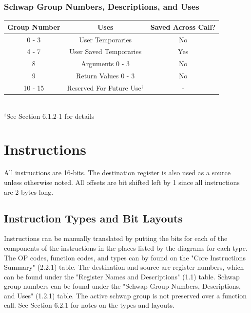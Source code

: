 \documentclass{article}
\begin{document}
		\subsubsection{Schwap Group Numbers, Descriptions, and Uses}
			\begin{center}
				\begin{tabular}{| c | c | c |}
					\hline
				    	Group Number & Uses                      & Saved Across Call? \\ \hline
					    0 - 3        & User Temporaries          & No \\ \hline
					    4 - 7        & User Saved Temporaries    & Yes\\ \hline
					    8            & Arguments 0 - 3           & No \\ \hline
					    9            & Return Values 0 - 3       & No \\ \hline
					    10 - 15      & Reserved For Future Use$^\dagger$ & -  \\ \hline
				\end{tabular} \\
				$^\dagger$See Section 6.1.2-1 for details
			\end{center}
\newpage
\section{Instructions}
	All instructions are 16-bits.  The destination register is also used as a source unless otherwise noted.  All offsets are bit shifted left by 1 since all instructions are 2 bytes long.
	\subsection{Instruction Types and Bit Layouts}
		Instructions can be manually translated by putting the bits for each of the components of the instructions in the places listed by the diagrams for each type.  The OP codes, function codes, and types can by found on the "Core Instructions Summary" (2.2.1) table.  The destination and source are register numbers, which can be found under the "Register Names and Descriptions" (1.1) table.  Schwap group numbers can be found under the "Schwap Group Numbers, Descriptions, and Uses" (1.2.1) table.  The active schwap group is not preserved over a function call.  See Section 6.2.1 for notes on the types and layouts.
\end{document}

